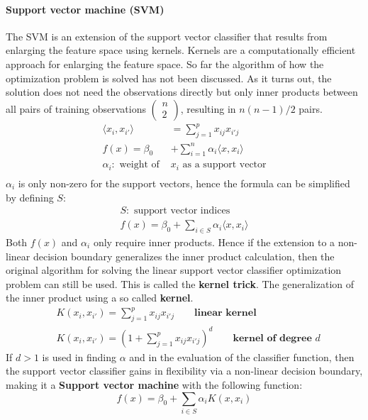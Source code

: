 \documentclass[../document.tex]{subfiles}
\begin{document}
	\paragraph{Support vector machine (SVM)}
	The SVM is an extension of the support vector classifier that results from enlarging the feature space using kernels. Kernels are a computationally efficient approach for enlarging the feature space. So far the algorithm of how the optimization problem is solved has not been discussed. As it turns out, the solution does not need the observations directly but only inner products between all pairs of training observations $\left(\begin{matrix}n\\2\end{matrix}\right)$, resulting in $n(n-1)/2$ pairs.
	\begin{equation}
	\begin{split}
		\langle x_{i},x_{i'}\rangle&=\sum_{j=1}^{p}x_{ij}x_{i'j}\\
		f(x)=\beta_{0}&+\sum_{i=1}^{n}\alpha_{i} \langle x,x_{i}\rangle\\
		\alpha_i: \text{ weight of }&x_i\text{ as a support vector}\\
	\end{split}
	\end{equation}
	$\alpha_{i}$ is only non-zero for the support vectors, hence the formula can be simplified by defining $S$:
	\begin{equation}
	\begin{split}
		S: \text{ support vector indices}\\
		f(x)=\beta_{0}+\sum_{i\in S}\alpha_{i}\langle x,x_{i}\rangle
	\end{split}
	\end{equation}
	Both $f(x)$ and $\alpha_i$ only require inner products. Hence if the extension to a non-linear decision boundary generalizes the inner product calculation, then the original algorithm for solving the linear support vector classifier optimization problem can still be used. This is called the \textbf{kernel trick}. The generalization of the inner product using a so called \textbf{kernel}.
	\begin{equation}
	\begin{split}
		&K(x_{i},x_{i'})=\sum_{j=1}^{p}x_{ij}x_{i'j} \qquad \textbf{linear kernel}\\
		&K(x_{i},x_{i'})=\left(1+\sum_{j=1}^{p}x_{ij}x_{i'j}\right)^d \qquad \textbf{kernel of degree }d
	\end{split}
	\end{equation}
	If $d>1$ is used in finding $\alpha$ and in the evaluation of the classifier function, then the support vector classifier gains in flexibility via a non-linear decision boundary, making it a \textbf{Support vector machine} with the following function:
	\begin{equation}
		f(x)=\beta_{0}+\sum_{i\in S}\alpha_{i}K(x,x_{i})
	\end{equation}
\end{document}
